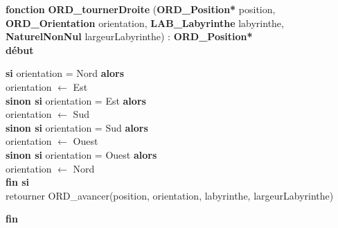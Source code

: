 \noindent\textbf{fonction} \textbf{ORD\_tournerDroite} (\textbf{ORD\_Position*} position, \textbf{ORD\_Orientation} orientation, \textbf{LAB\_Labyrinthe} labyrinthe, \textbf{NaturelNonNul} largeurLabyrinthe) : \textbf{ORD\_Position*}\\
\textbf{début}
\begin{flushleft}
    \hspace*{1cm}\textbf{si} orientation = Nord \textbf{alors}\\
    \hspace*{2cm}orientation $\gets$ Est\\
    \hspace*{1cm}\textbf{sinon si} orientation = Est \textbf{alors}\\
    \hspace*{2cm}orientation $\gets$ Sud\\
    \hspace*{1cm}\textbf{sinon si} orientation = Sud \textbf{alors}\\
    \hspace*{2cm}orientation $\gets$ Ouest\\
    \hspace*{1cm}\textbf{sinon si} orientation = Ouest \textbf{alors}\\
    \hspace*{2cm}orientation $\gets$ Nord\\
    \hspace*{1cm}\textbf{fin si}\\
    \hspace*{1cm}retourner ORD\_avancer(position, orientation, labyrinthe, largeurLabyrinthe)
\end{flushleft}
\textbf{fin}\\

